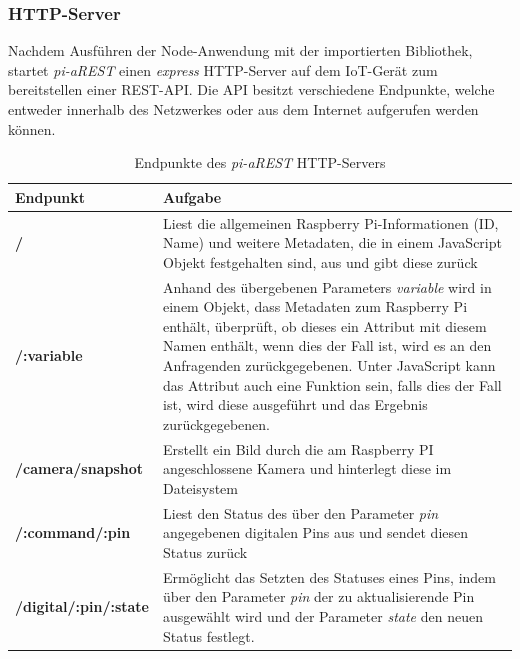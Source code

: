 \subsubsection{HTTP-Server}
Nachdem Ausführen der Node-Anwendung mit der importierten Bibliothek, startet \textit{pi-aREST} einen 
\textit{express} HTTP-Server auf dem IoT-Gerät zum bereitstellen einer REST-API. Die API besitzt
verschiedene Endpunkte, welche entweder innerhalb des Netzwerkes oder aus dem Internet aufgerufen werden
können. 

\begin{table}[h!]
  \footnotesize
  \centering
  \label{tab:security-threats}
  \begin{tabular}{p{4cm}p{9cm}}
    \textbf{Endpunkt} & \textbf{Aufgabe}\\
    \hline
    \textbf{/} & Liest die allgemeinen Raspberry Pi-Informationen (ID, Name) und weitere
		    Metadaten, die in einem JavaScript Objekt festgehalten sind, aus und gibt 
		   diese zurück  \\

    \textbf{/:variable} & Anhand des übergebenen Parameters \textit{variable} wird in einem 
				Objekt, dass Metadaten zum Raspberry Pi enthält, überprüft, ob dieses ein
				Attribut mit diesem Namen enthält, wenn dies der Fall ist, wird es an den
				Anfragenden zurückgegebenen. Unter JavaScript kann das Attribut auch
				eine Funktion sein, falls dies der Fall ist, wird diese ausgeführt und das 
				Ergebnis zurückgegebenen. \\

    \textbf{/camera/snapshot} & Erstellt ein Bild durch die am Raspberry PI angeschlossene Kamera 
					     und hinterlegt diese im Dateisystem  \\

    \textbf{/:command/:pin} & Liest den Status des über den Parameter \textit{pin} angegebenen digitalen
					Pins aus und sendet diesen Status zurück   \\

    \textbf{/digital/:pin/:state} & Ermöglicht das Setzten des Statuses eines Pins, indem über den Parameter 
					\textit{pin} der zu aktualisierende Pin ausgewählt wird und der Parameter
					\textit{state} den neuen Status festlegt.  \\
  \end{tabular}
  \caption{Endpunkte des \textit{pi-aREST} HTTP-Servers}
\end{table}

\pagebreak

